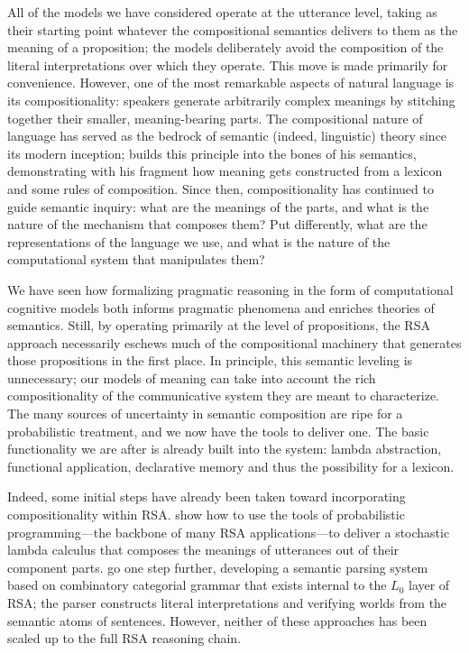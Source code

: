 \documentclass{sp}
\begin{document}
All of the models we have considered operate at the utterance level, taking as their starting point whatever the compositional semantics delivers to them as the meaning of a proposition; the models deliberately avoid the composition of the literal interpretations over which they operate. This move is made primarily for convenience. However, one of the most remarkable aspects of natural language is its compositionality: speakers generate arbitrarily complex meanings by stitching together their smaller, meaning-bearing parts. The compositional nature of language has served as the bedrock of semantic (indeed, linguistic) theory since its modern inception; \cite{montague1973} builds this principle into the bones of his semantics, demonstrating with his fragment how meaning gets constructed from a lexicon and some rules of composition. Since then, compositionality has continued to guide semantic inquiry: what are the meanings of the parts, and what is the nature of the mechanism that composes them? Put differently, what are the representations of the language we use, and what is the nature of the computational system that manipulates them?

We have seen how formalizing pragmatic reasoning in the form of computational cognitive models both informs pragmatic phenomena and enriches theories of semantics. Still, by operating primarily at the level of propositions, the RSA approach necessarily eschews much of the compositional machinery that generates those propositions in the first place. In principle, this semantic leveling is unnecessary; our models of meaning can take into account the rich compositionality of the communicative system they are meant to characterize. The many sources of uncertainty in semantic composition are ripe for a probabilistic treatment, and we now have the tools to deliver one. The basic functionality we are after is already built into the system: lambda abstraction, functional application, declarative memory and thus the possibility for a lexicon.

Indeed, some initial steps have already been taken toward incorporating compositionality within RSA. \cite{goodmanlassiter2015handbook} show how to use the tools of probabilistic programming---the backbone of many RSA applications---to deliver a stochastic lambda calculus that composes the meanings of utterances out of their component parts. \cite{goodmanstuhlmuller2014} go one step further, developing a semantic parsing system based on combinatory categorial grammar that exists internal to the $L_0$ layer of RSA; the parser constructs literal interpretations and verifying worlds from the semantic atoms of sentences. However, neither of these approaches has been scaled up to the full RSA reasoning chain.
\end{document}
